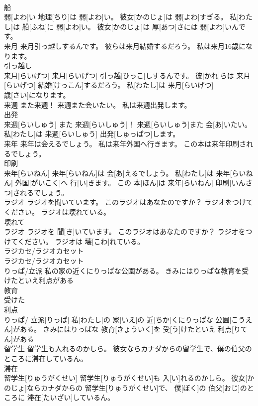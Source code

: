 \documentclass[8pt]{extreport}
\begin{document}
\begin{CJK}{UTF8}{min}
\\	船 
\\	弱[よわ]い 地理[ちり]は 弱[よわ]い。 彼女[かのじょ]は 弱[よわ]すぎる。 私[わたし]は 船[ふね]に 弱[よわ]い。 彼女[かのじょ]は 厚[あつ]さには 弱[よわ]いんです。
\\	来月 来月引っ越しするんです。 彼らは来月結婚するだろう。 私は来月16歳になります。	
\\	引っ越し 
\\	来月[らいげつ] 来月[らいげつ] 引っ越[ひっこ]しするんです。 彼[かれ]らは 来月[らいげつ] 結婚[けっこん]するだろう。 私[わたし]は 来月[らいげつ] 
\\	歳[さい]になります。
\\	来週 また来週！ 来週また会いたい。 私は来週出発します。	
\\	出発 
\\	来週[らいしゅう] また 来週[らいしゅう]！ 来週[らいしゅう]また 会[あ]いたい。 私[わたし]は 来週[らいしゅう] 出発[しゅっぱつ]します。
\\	来年 来年は会えるでしょう。 私は来年外国へ行きます。 この本は来年印刷されるでしょう。	
\\	印刷 
\\	来年[らいねん] 来年[らいねん]は 会[あ]えるでしょう。 私[わたし]は 来年[らいねん] 外国[がいこく]へ 行[い]きます。 この 本[ほん]は 来年[らいねん] 印刷[いんさつ]されるでしょう。
\\	ラジオ ラジオを聞いています。 このラジオはあなたのですか？ ラジオをつけてください。 ラジオは壊れている。	
\\	壊れて　
\\	ラジオ ラジオを 聞[き]いています。 このラジオはあなたのですか？ ラジオをつけてください。 ラジオは 壊[こわ]れている。
\\	ラジカセ/ラジオカセット	
\\	ラジカセ/ラジオカセット
\\	りっぱ/立派 私の家の近くにりっぱな公園がある。 きみにはりっぱな教育を受けたといえ利点がある	
\\	教育 
\\	受けた 
\\	利点 
\\	りっぱ/ 立派[りっぱ] 私[わたし]の 家[いえ]の 近[ちか]くにりっぱな 公園[こうえん]がある。 きみにはりっぱな 教育[きょういく]を 受[う]けたといえ 利点[りてん]がある
\\	留学生 留学生も入れるのかしら。 彼女ならカナダからの留学生で、僕の伯父のところに滞在しているん。	
\\	滞在 
\\	留学生[りゅうがくせい] 留学生[りゅうがくせい]も 入[い]れるのかしら。 彼女[かのじょ]ならカナダからの 留学生[りゅうがくせい]で、 僕[ぼく]の 伯父[おじ]のところに 滞在[たいざい]しているん。

\end{CJK}
\end{document}
